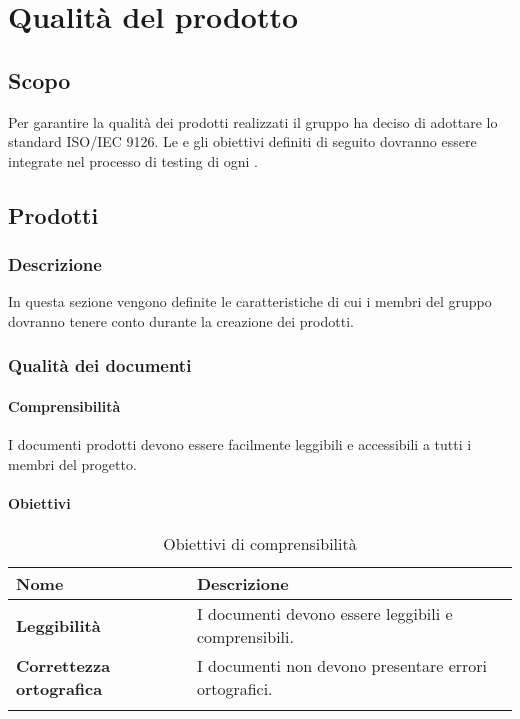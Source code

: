 \section{Qualità del prodotto}
\subsection{Scopo}
Per garantire la qualità dei prodotti realizzati il gruppo \gruppo{} ha deciso di adottare lo standard ISO/IEC 9126.
Le  e gli obiettivi definiti di seguito dovranno essere integrate nel processo di testing di ogni .
\subsection{Prodotti}
\subsubsection{Descrizione}
In questa sezione vengono definite le caratteristiche di cui i membri del gruppo \gruppo{} dovranno tenere conto durante la creazione dei prodotti.
\subsubsection{Qualità dei documenti}
\label{QualitàDoc}
\paragraph{Comprensibilità}
I documenti prodotti devono essere facilmente leggibili e accessibili a tutti i membri del progetto. \\

\paragraph*{Obiettivi}
\setlength{\freewidth}{\dimexpr\textwidth-0\tabcolsep}
	\renewcommand{\arraystretch}{1.5}
	\setlength{\aboverulesep}{0pt}
	\setlength{\belowrulesep}{0pt}
	\begin{longtable}{L{.365\freewidth} L{.6 \freewidth}}
		\textbf{Nome} & \textbf{Descrizione} \\
		\toprule
		\endhead		
		\textbf{Leggibilità} & I documenti devono essere leggibili e comprensibili. \\
		\textbf{Correttezza ortografica} & I documenti non devono presentare errori ortografici. \\
		\bottomrule
		\hiderowcolors
		\caption{Obiettivi di comprensibilità}
	\end{longtable}
